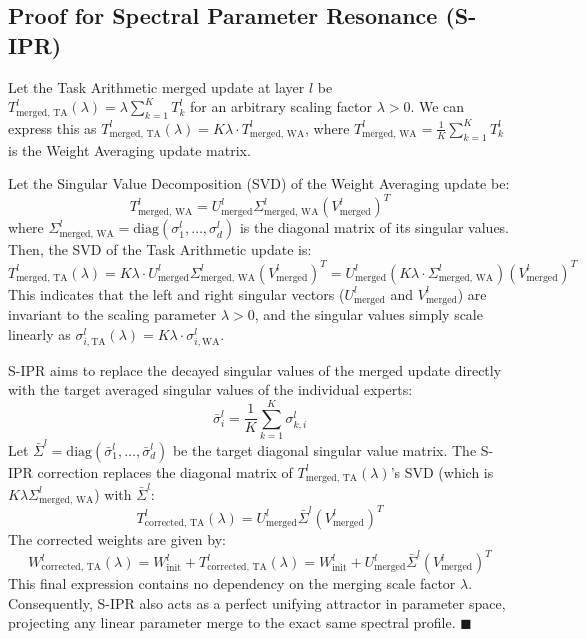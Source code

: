 \documentclass{article}
\begin{document}
\subsection{Proof for Spectral Parameter Resonance (S-IPR)}
Let the Task Arithmetic merged update at layer $l$ be $T_{\text{merged, TA}}^l(\lambda) = \lambda \sum_{k=1}^K T_k^l$ for an arbitrary scaling factor $\lambda > 0$. We can express this as $T_{\text{merged, TA}}^l(\lambda) = K\lambda \cdot T_{\text{merged, WA}}^l$, where $T_{\text{merged, WA}}^l = \frac{1}{K} \sum_{k=1}^K T_k^l$ is the Weight Averaging update matrix.

Let the Singular Value Decomposition (SVD) of the Weight Averaging update be:
\begin{equation}
    T_{\text{merged, WA}}^l = U_{\text{merged}}^l \Sigma_{\text{merged, WA}}^l (V_{\text{merged}}^l)^T
\end{equation}
where $\Sigma_{\text{merged, WA}}^l = \text{diag}(\sigma_{1}^l, \dots, \sigma_{d}^l)$ is the diagonal matrix of its singular values.
Then, the SVD of the Task Arithmetic update is:
\begin{equation}
    T_{\text{merged, TA}}^l(\lambda) = K\lambda \cdot U_{\text{merged}}^l \Sigma_{\text{merged, WA}}^l (V_{\text{merged}}^l)^T = U_{\text{merged}}^l (K\lambda \cdot \Sigma_{\text{merged, WA}}^l) (V_{\text{merged}}^l)^T
\end{equation}
This indicates that the left and right singular vectors ($U_{\text{merged}}^l$ and $V_{\text{merged}}^l$) are invariant to the scaling parameter $\lambda > 0$, and the singular values simply scale linearly as $\sigma_{i, \text{TA}}^l(\lambda) = K \lambda \cdot \sigma_{i, \text{WA}}^l$.

S-IPR aims to replace the decayed singular values of the merged update directly with the target averaged singular values of the individual experts:
\begin{equation}
    \bar{\sigma}_i^l = \frac{1}{K} \sum_{k=1}^K \sigma_{k, i}^l
\end{equation}
Let $\bar{\Sigma}^l = \text{diag}(\bar{\sigma}_1^l, \dots, \bar{\sigma}_d^l)$ be the target diagonal singular value matrix. The S-IPR correction replaces the diagonal matrix of $T_{\text{merged, TA}}^l(\lambda)$'s SVD (which is $K\lambda \Sigma_{\text{merged, WA}}^l$) with $\bar{\Sigma}^l$:
\begin{equation}
    T_{\text{corrected, TA}}^l(\lambda) = U_{\text{merged}}^l \bar{\Sigma}^l (V_{\text{merged}}^l)^T
\end{equation}
The corrected weights are given by:
\begin{equation}
    W_{\text{corrected, TA}}^l(\lambda) = W_{\text{init}}^l + T_{\text{corrected, TA}}^l(\lambda) = W_{\text{init}}^l + U_{\text{merged}}^l \bar{\Sigma}^l (V_{\text{merged}}^l)^T
\end{equation}
This final expression contains no dependency on the merging scale factor $\lambda$. Consequently, S-IPR also acts as a perfect unifying attractor in parameter space, projecting any linear parameter merge to the exact same spectral profile. $\blacksquare$
\end{document}
